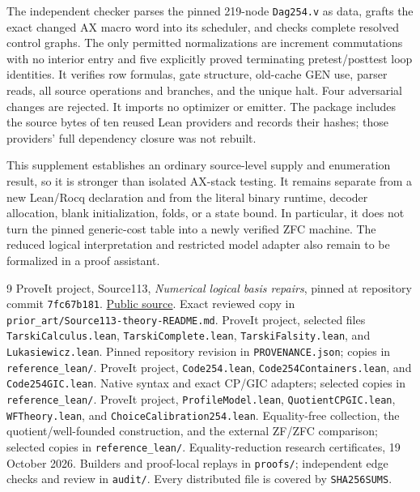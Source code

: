 \documentclass[11pt,letterpaper]{article}
\theoremstyle{definition}\newtheorem{definition}[theorem]{Definition}
\theoremstyle{remark}\newtheorem{remark}[theorem]{Remark}
\newcommand{\file}[1]{\begingroup\small\ttfamily\nolinkurl{#1}\endgroup}
\begin{document}
The independent checker parses the pinned 219-node \file{Dag254.v} as data, grafts the exact changed AX macro word into its scheduler, and checks complete resolved control graphs. The only permitted normalizations are increment commutations with no interior entry and five explicitly proved terminating pretest/posttest loop identities. It verifies row formulas, gate structure, old-cache GEN use, parser reads, all source operations and branches, and the unique halt. Four adversarial changes are rejected. It imports no optimizer or emitter. The package includes the source bytes of ten reused Lean providers and records their hashes; those providers' full dependency closure was not rebuilt.

This supplement establishes an ordinary source-level supply and enumeration result, so it is stronger than isolated AX-stack testing. It remains separate from a new Lean/Rocq declaration and from the literal binary runtime, decoder allocation, blank initialization, folds, or a state bound. In particular, it does not turn the pinned generic-cost table into a newly verified ZFC machine. The reduced logical interpretation and restricted model adapter also remain to be formalized in a proof assistant.

\begin{thebibliography}{9}
 ProveIt project, Source113, \emph{Numerical logical basis repairs}, pinned at repository commit \file{7fc67b181}. \href{https://github.com/VladimirReshetnikov/ProveIt/blob/7fc67b181/SetTheory/Cardinals/docs/reports/set-theory/zfc-closure-kernels/113-aud236-theory-README.md}{Public source}. Exact reviewed copy in \file{prior_art/Source113-theory-README.md}.
 ProveIt project, selected files \file{TarskiCalculus.lean}, \file{TarskiComplete.lean}, \file{TarskiFalsity.lean}, and \file{Lukasiewicz.lean}. Pinned repository revision in \file{PROVENANCE.json}; copies in \file{reference_lean/}.
 ProveIt project, \file{Code254.lean}, \file{Code254Containers.lean}, and \file{Code254GIC.lean}. Native syntax and exact CP/GIC adapters; selected copies in \file{reference_lean/}.
 ProveIt project, \file{ProfileModel.lean}, \file{QuotientCPGIC.lean}, \file{WFTheory.lean}, and \file{ChoiceCalibration254.lean}. Equality-free collection, the quotient/well-founded construction, and the external ZF/ZFC comparison; selected copies in \file{reference_lean/}.
 Equality-reduction research certificates, 19 October 2026. Builders and proof-local replays in \file{proofs/}; independent edge checks and review in \file{audit/}. Every distributed file is covered by \file{SHA256SUMS}.
\end{thebibliography}
\end{document}
